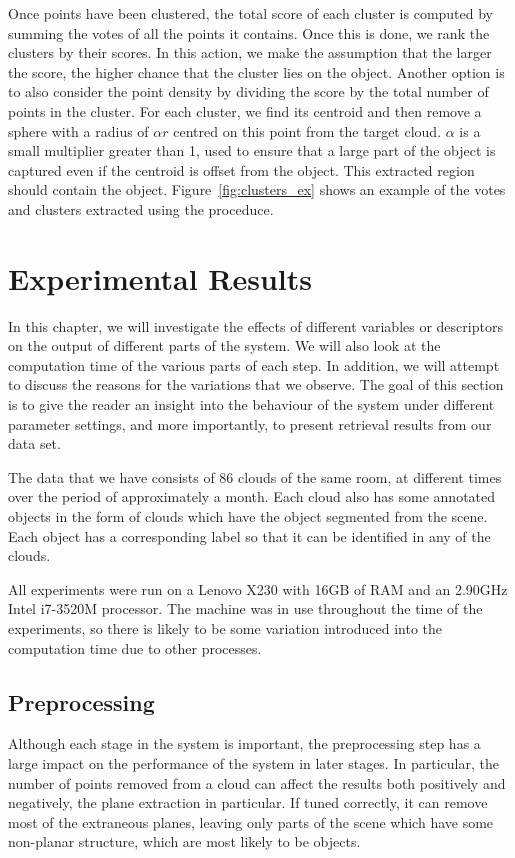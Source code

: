 \documentclass[11pt,a4paper]{kth-mag}
\begin{document}
Once points have been clustered, the total score of each cluster is computed by
summing the votes of all the points it contains. Once this is done, we rank the
clusters by their scores. In this action, we make the assumption that the larger
the score, the higher chance that the cluster lies on the object. Another option
is to also consider the point density by dividing the score by the total number
of points in the cluster. For each cluster, we find its centroid and then remove
a sphere with a radius of $\alpha r$ centred on this point from the target
cloud. $\alpha$ is a small multiplier greater than 1, used to ensure that a
large part of the object is captured even if the centroid is offset from the
object. This extracted region should contain the object.
Figure~\ref{fig:clusters_ex} shows an example of the votes and clusters
extracted using the proceduce.




\chapter{Experimental Results}
\label{chap:exp}
In this chapter, we will investigate the effects of different variables or
descriptors on the output of different parts of the system. We will also look at
the computation time of the various parts of each step. In addition, we will
attempt to discuss the reasons for the variations that we observe. The goal of
this section is to give the reader an insight into the behaviour of the system
under different parameter settings, and more importantly, to present retrieval
results from our data set.

The data that we have consists of 86 clouds of the same room, at different times
over the period of approximately a month. Each cloud also has some annotated
objects in the form of clouds which have the object segmented from the scene.
Each object has a corresponding label so that it can be identified in any of the
clouds.

All experiments were run on a Lenovo X230 with 16GB of RAM and an 2.90GHz Intel
i7-3520M processor. The machine was in use throughout the time of the
experiments, so there is likely to be some variation introduced into the
computation time due to other processes.

\section{Preprocessing}
Although each stage in the system is important, the preprocessing step has a
large impact on the performance of the system in later stages. In particular,
the number of points removed from a cloud can affect the results both positively
and negatively, the plane extraction in particular. If tuned correctly, it can
remove most of the extraneous planes, leaving only parts of the scene which have
some non-planar structure, which are most likely to be objects. 
\end{document}
